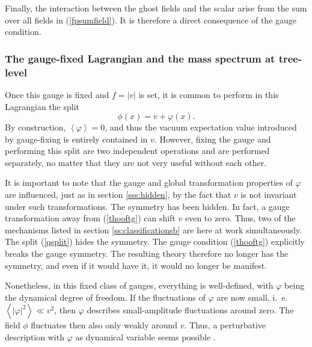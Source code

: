 \documentclass[final,12pt,3p,longtitle]{elsarticle}
\newcommand*{\no}{\noindent}
\newcommand*{\be}{\begin{equation}}
\newcommand*{\ee}{\end{equation}}
\newcommand*{\pref}[1]{(\ref{#1})}
\newcommand*{\1}{1\!\!\!\bot}
\newcommand*{\la}{\left\langle}
\newcommand*{\ra}{\right\rangle}
\begin{document}
Finally, the interaction between the ghost fields and the scalar arise from the sum over all fields in \pref{fpsumfield}. It is therefore a direct consequence of the gauge condition.

\subsubsection{The gauge-fixed Lagrangian and the mass spectrum at tree-level}

Once this gauge is fixed and $f=|v|$ is set, it is common to perform in this Lagrangian the split \cite{Lee:1974zg,Bohm:2001yx}
\be
\phi(x)=v+\varphi(x)\label{qsplit}.
\ee
\no By construction, $\la\varphi\ra=0$, and thus the vacuum expectation value introduced by gauge-fixing is entirely contained in $v$. However, fixing the gauge and performing this split are two independent operations and are performed separately, no matter that they are not very useful without each other.

It is important to note that the gauge and global transformation properties of $\varphi$ are influenced, just as in section \ref{sss:hidden}, by the fact that $v$ is not invariant under such transformations. The symmetry has been hidden. In fact, a gauge transformation away from \pref{thooftg} can shift $v$ even to zero. Thus, two of the mechanisms listed in section \ref{ss:classificationsb} are here at work simultaneously. The split \pref{qsplit} hides the symmetry. The gauge condition \pref{thooftg} explicitly breaks the gauge symmetry. The resulting theory therefore no longer has the symmetry, and even if it would have it, it would no longer be manifest.

Nonetheless, in this fixed class of gauges, everything is well-defined, with $\varphi$ being the dynamical degree of freedom. If the fluctuations of $\varphi$ are now small, i.\ e.\ $\la|\varphi|^2\ra\ll v^2$, then $\varphi$ describes small-amplitude fluctuations around zero. The field $\phi$ fluctuates then also only weakly around $v$. Thus, a perturbative description with $\varphi$ as dynamical variable seems possible \cite{Lee:1974zg,Damgaard:1985nb,Bohm:2001yx}.
\end{document}
